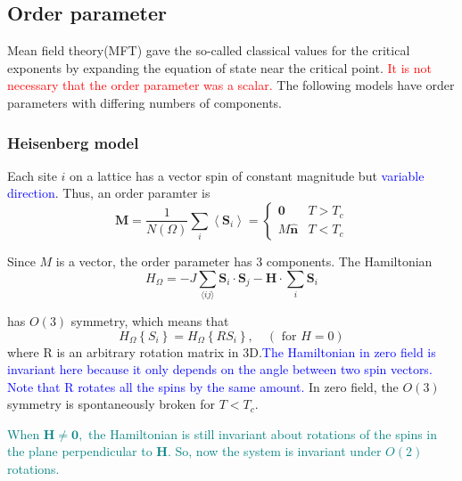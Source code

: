 \documentclass[12pt,titlepage]{article}
\newcommand{\redp}[1]{\textcolor{red}{#1}}
\newcommand{\bluep}[1]{\textcolor{blue}{#1}}
\newcommand{\tealp}[1]{\textcolor{teal}{#1}}
\numberwithin{equation}{section}
\begin{document}
\subsection{Order parameter}
Mean field theory(MFT) gave the so-called classical values for the critical exponents by expanding the equation of state near the critical point. \redp{It is not necessary that the order parameter was a scalar.} The following models have order parameters with differing numbers of components.
\subsubsection{Heisenberg model}
Each site $i$ on a lattice has a vector spin of constant magnitude but \bluep{variable direction}. Thus, an order paramter is
\begin{equation}
\mathbf{M}=\frac{1}{N(\Omega)} \sum_{i}\left\langle\mathbf{S}_{i}\right\rangle=\left\{\begin{array}{ll}{\mathbf{0}} & {T>T_{c}} \\ {M \hat{\mathbf{n}}} & {T<T_{c}}\end{array}\right.
\end{equation}

Since $M$ is a vector, the order parameter has 3 components. The Hamiltonian
\begin{equation}
H_{\Omega}=-J \sum_{\langle i j\rangle} \mathbf{S}_{i} \cdot \mathbf{S}_{j}-\mathbf{H} \cdot \sum_{i} \mathbf{S}_{i}
\end{equation}

has $O(3)$ symmetry, which means that
\begin{equation}
H_{\Omega}\left\{S_{i}\right\}=H_{\Omega}\left\{R S_{i}\right\}, \quad(\text { for } H=0)
\end{equation}
where R is an arbitrary rotation matrix in 3D.\bluep{The Hamiltonian in zero field is invariant here because it only depends on the angle between two spin vectors. Note that R rotates all the spins by the same amount.} In zero field, the $O(3)$ symmetry is spontaneously broken for $T<T_c$. 

\tealp{When $\mathbf{H} \neq \mathbf{0},$ the Hamiltonian is still invariant about rotations of the spins in the plane perpendicular to $\mathbf{H} .$ So, now the system is invariant under $O(2)$ rotations.}
\end{document}
